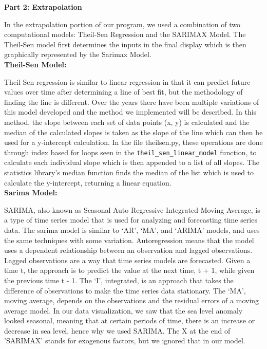 \documentclass[fontsize=11pt]{article}
\begin{document}
    \textbf{Part 2: Extrapolation}

    \hspace{\parindent}In the extrapolation portion of our program, we used a combination of two computational models: Theil-Sen Regression and the SARIMAX Model. The Theil-Sen model first determines the inputs in the final display which is then graphically represented by the Sarimax Model. \\

    \textbf{Theil-Sen Model:}

    Theil-Sen regression is similar to linear regression in that it can predict future values over time after determining a line of best fit, but the methodology of finding the line is different. Over the years there have been multiple variations of this model developed and the method we implemented will be described. In this method, the slope between each set of data points (x, y) is calculated and the median of the calculated slopes is taken as the slope of the line which can then be used for a y-intercept calculation. In the file theilsen.py, these operations are done through index based for loops seen in the \texttt{theil\_sen\_linear\_model} function, to calculate each individual slope which is then appended to a list of all slopes. The statistics library’s median function finds the median of the list which is used to calculate the y-intercept, returning a linear equation. \\

    \textbf{Sarima Model:}

    \hspace{\parindent}SARIMA, also known as Seasonal Auto Regressive Integrated Moving Average, is a type of time series model that is used for analyzing and forecasting time series data. The sarima model is similar to ‘AR’, ‘MA’, and ‘ARIMA’ models, and uses the same techniques with some variation. Autoregression means that the model uses a dependent relationship between an observation and lagged observations. Lagged observations are a way that time series models are forecasted. Given a time t, the approach is to predict the value at the next time, t + 1, while given the previous time t - 1. The ‘I’, integrated, is an approach that takes the difference of observations to make the time series data stationary. The ‘MA’, moving average, depends on the observations and the residual errors of a moving average model. In our data visualization, we saw that the sea level anomaly looked seasonal, meaning that at certain periods of time, there is an increase or decrease in sea level, hence why we used SARIMA.  The X at the end of 'SARIMAX' stands for exogenous factors, but we ignored that in our model. \\
\end{document}
